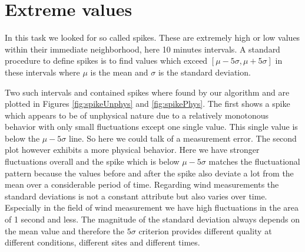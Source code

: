 \documentclass[10pt]{article}
\begin{document}
\section{Extreme values}
In this task we looked for so called spikes. These are extremely high or low values within their immediate neighborhood, here 10 minutes intervals. A standard procedure to define spikes is to find values which exceed $[\mu - 5\sigma , \mu+5\sigma]$ in these intervals where $\mu$ is the mean and $\sigma$ is the standard deviation. 

Two such intervals and contained spikes where found by our algorithm and are plotted in Figures \ref{fig:spikeUnphys} and \ref{fig:spikePhys}. The first shows a spike which appears to be of unphysical nature due to a relatively monotonous behavior with only small fluctuations except one single value. This single value is below the $\mu-5\sigma$ line. So here we could talk of a measurement error. The second plot however exhibits a more physical behavior. Here we have stronger fluctuations overall and the spike which is below $\mu-5\sigma$ matches the fluctuational pattern because the values before and after the spike also deviate a lot from the mean over a considerable period of time.
Regarding wind measurements the standard deviations is not a constant attribute but also varies over time. Especially in the field of wind measurement we have high fluctuations in the area of 1 second and less. The magnitude of the standard deviation always depends on the mean value and therefore the $5 \sigma$ criterion provides different quality at different conditions, different sites and different times.
\end{document}
